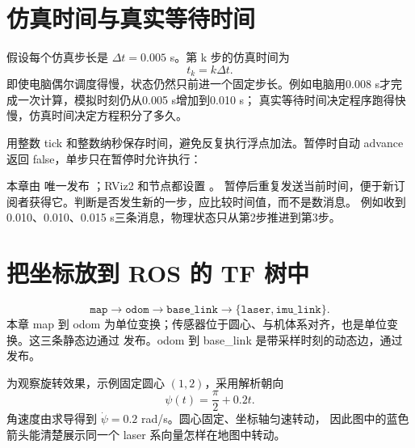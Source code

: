 \section{仿真时间与真实等待时间}
假设每个仿真步长是 $\Delta t=0.005$ s。第 k 步的仿真时间为
\begin{equation}
t_k=k\Delta t.
\end{equation}
即使电脑偶尔调度得慢，状态仍然只前进一个固定步长。例如电脑用0.008 s才完成一次计算，模拟时刻仍从0.005 s增加到0.010 s；
真实等待时间决定程序跑得快慢，仿真时间决定方程积分了多久。

 用整数 tick 和整数纳秒保存时间，避免反复执行浮点加法。暂停时自动 advance 返回 false，单步只在暂停时允许执行：
\par\noindent\begin{minipage}{\linewidth}

\end{minipage}\par
本章由  唯一发布 ；RViz2 和节点都设置 。
暂停后重复发送当前时间，便于新订阅者获得它。判断是否发生新的一步，应比较时间值，而不是数消息。
例如收到0.010、0.010、0.015 s三条消息，物理状态只从第2步推进到第3步。

\section{把坐标放到 ROS 的 TF 树中}
\[
\texttt{map}\to\texttt{odom}\to\texttt{base\_link}
\to\{\texttt{laser},\texttt{imu\_link}\}.
\]
本章 map 到 odom 为单位变换；传感器位于圆心、与机体系对齐，也是单位变换。这三条静态边通过  发布。odom 到 base\_link 是带采样时刻的动态边，通过  发布。

为观察旋转效果，示例固定圆心 $(1,2)$，采用解析朝向
\begin{equation}
\psi(t)=\frac{\pi}{2}+0.2t.
\end{equation}
角速度由求导得到 $\dot\psi=0.2$ rad/s。圆心固定、坐标轴匀速转动，
因此图中的蓝色箭头能清楚展示同一个 laser 系向量怎样在地图中转动。

